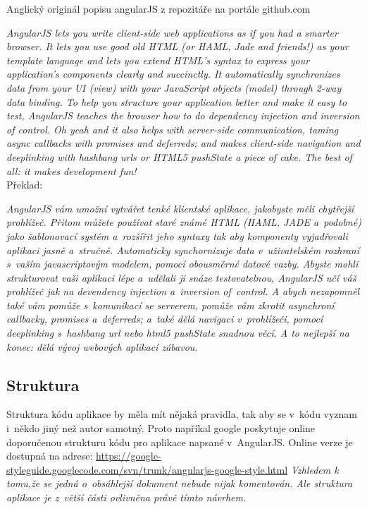 \documentclass[a4paper,12pt,twoside,BCOR=10mm]{article}
\renewcommand{\it}[1]{\textit{#1}}    %
\begin{document}
Anglický originál popisu angularJS z repozitáře na portále github.com


\it{AngularJS lets you write client-side web applications as if you had a smarter browser. It lets you use good old HTML (or HAML, Jade and friends!) as your template language and lets you extend HTML’s syntax to express your application’s components clearly and succinctly. It automatically synchronizes data from your UI (view) with your JavaScript objects (model) through 2-way data binding. To help you structure your application better and make it easy to test, AngularJS teaches the browser how to do dependency injection and inversion of control. Oh yeah and it also helps with server-side communication, taming async callbacks with promises and deferreds; and makes client-side navigation and deeplinking with hashbang urls or HTML5 pushState a piece of cake. The best of all: it makes development fun!}\cite{angularGITHUB}\\

Překlad:

\it{AngularJS vám umožní vytvářet tenké klientské aplikace, jakobyste měli chytřejší prohlížeč. Přitom můžete používat staré známé HTML (HAML, JADE a~podobné) jako šablonovací systém a~rozšířit jeho syntaxy tak aby komponenty vyjadřovali aplikaci jasně a~stručně. Automaticky synchornizuje data v~uživatelském rozhraní s~vaším javascriptovým modelem, pomocí obousměrné datové vazby. Abyste mohli strukturovat vaši aplikaci lépe a~udělali ji snáze testovatelnou, AngularJS učí váš prohlížeč jak na devendency injection a~inversion of~control. A abych nezapomněl také vám pomůže s~komunikací se serverem, pomůže vám zkrotit asynchroní callbacky, promises a~deferreds; a~také dělá navigaci v~prohlížeči, pomocí deeplinking s~hashbang url nebo html5 pushState snadnou věcí. A to nejlepší na konec: dělá vývoj webových aplikací zábavou.}\cite{angularGITHUB}\\

\subsection{Struktura}
Struktura kódu aplikace by měla mít nějaká pravidla, tak aby se v~kódu vyznam i~někdo jiný než autor samotný. Proto napříkal google poskytuje online doporučenou strukturu kódu pro aplikace napsané v~AngularJS. Online verze je dostupná na adrese: \href{https://google-styleguide.googlecode.com/svn/trunk/angularjs-google-style.html}{https://google-styleguide.googlecode.com/svn/trunk/angularjs-google-style.html}
\it{Vzhledem k tomu,že se jedná o~obsáhlejší dokument nebude nijak komentován. Ale struktura aplikace je z~větší části ovlivněna právě tímto návrhem.}\\
\end{document}
